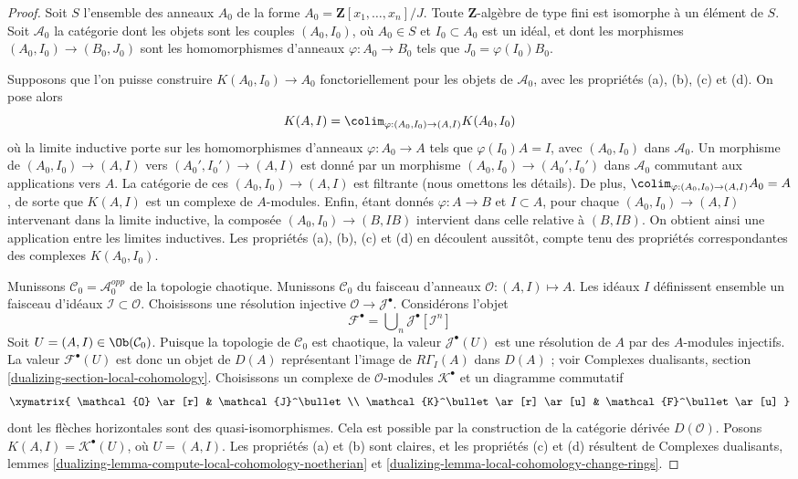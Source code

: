 \begin{proof}
Soit $S$ l'ensemble des anneaux $A_0$ de la forme
$A_0 = \mathbf{Z}[x_1, \ldots, x_n]/J$.
Toute $\mathbf{Z}$-algèbre de type fini est isomorphe à
un élément de $S$. Soit $\mathcal{A}_0$ la catégorie dont les objets
sont les couples $(A_0, I_0)$, où $A_0 \in S$ et $I_0 \subset A_0$
est un idéal, et dont les morphismes $(A_0, I_0) \to (B_0, J_0)$ sont
les homomorphismes d'anneaux $\varphi : A_0 \to B_0$ tels que $J_0 = \varphi(I_0)B_0$.

\medskip\noindent
Supposons que l'on puisse construire $K(A_0, I_0) \to A_0$ fonctoriellement pour
les objets de $\mathcal{A}_0$, avec les propriétés (a), (b), (c) et (d).
On pose alors
$$
K(A, I) = \colim_{\varphi : (A_0, I_0) \to (A, I)} K(A_0, I_0)
$$
où la limite inductive porte sur les homomorphismes d'anneaux $\varphi : A_0 \to A$ tels
que $\varphi(I_0)A = I$, avec $(A_0, I_0)$ dans $\mathcal{A}_0$.
Un morphisme de $(A_0, I_0) \to (A, I)$ vers $(A_0', I_0') \to (A, I)$
est donné par un morphisme $(A_0, I_0) \to (A_0', I_0')$ dans $\mathcal{A}_0$
commutant aux applications vers $A$.
La catégorie de ces $(A_0, I_0) \to (A, I)$ est filtrante
(nous omettons les détails). De plus, $\colim_{\varphi : (A_0, I_0) \to (A, I)} A_0 = A$,
de sorte que $K(A, I)$ est un complexe de $A$-modules.
Enfin, étant donnés $\varphi : A \to B$ et $I \subset A$,
pour chaque $(A_0, I_0) \to (A, I)$ intervenant dans la limite inductive, la composée
$(A_0, I_0) \to (B, IB)$ intervient dans celle relative à $(B, IB)$.
On obtient ainsi une application entre les limites inductives. Les propriétés (a), (b), (c) et (d)
en découlent aussitôt, compte tenu des propriétés correspondantes
des complexes $K(A_0, I_0)$.

\medskip\noindent
Munissons $\mathcal{C}_0 = \mathcal{A}_0^{opp}$ de la topologie chaotique.
Munissons $\mathcal{C}_0$ du faisceau d'anneaux
$\mathcal{O} : (A, I) \mapsto A$. Les idéaux $I$ définissent ensemble un
faisceau d'idéaux $\mathcal{I} \subset \mathcal{O}$.
Choisissons une résolution injective $\mathcal{O} \to \mathcal{J}^\bullet$.
Considérons l'objet
$$
\mathcal{F}^\bullet = \bigcup\nolimits_n \mathcal{J}^\bullet[\mathcal{I}^n]
$$
Soit $U = (A, I) \in \Ob(\mathcal{C}_0)$.
Puisque la topologie de $\mathcal{C}_0$ est chaotique, la valeur
$\mathcal{J}^\bullet(U)$ est une résolution de $A$ par des
$A$-modules injectifs. La valeur $\mathcal{F}^\bullet(U)$ est donc un
objet de $D(A)$ représentant l'image de $R\Gamma_I(A)$ dans $D(A)$ ; voir
Complexes dualisants, section \ref{dualizing-section-local-cohomology}.
Choisissons un complexe de $\mathcal{O}$-modules $\mathcal{K}^\bullet$
et un diagramme commutatif
$$
\xymatrix{
\mathcal{O} \ar[r] & \mathcal{J}^\bullet \\
\mathcal{K}^\bullet \ar[r] \ar[u] & \mathcal{F}^\bullet \ar[u]
}
$$
dont les flèches horizontales sont des quasi-isomorphismes. Cela est possible
par la construction de la catégorie dérivée $D(\mathcal{O})$.
Posons $K(A, I) = \mathcal{K}^\bullet(U)$, où $U = (A, I)$.
Les propriétés (a) et (b) sont claires, et les propriétés (c) et (d)
résultent de Complexes dualisants, lemmes
\ref{dualizing-lemma-compute-local-cohomology-noetherian} et
\ref{dualizing-lemma-local-cohomology-change-rings}.
\end{proof}

